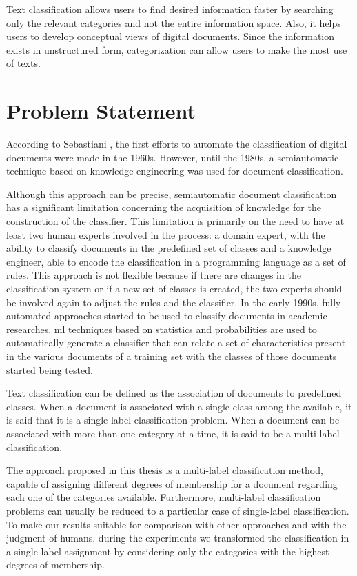 Text classification allows users to find desired information faster by searching only the relevant categories and not the entire information space. Also, it helps users to develop conceptual views of digital documents. Since the information exists in unstructured form, categorization can allow users to make the most use of texts. 




\section{\hspace*{3pt}Problem Statement}


According to Sebastiani \cite{Sebastiani:2002}, the first efforts to automate the classification of digital documents were made in the 1960s. However, until the 1980s, a semiautomatic technique based on knowledge engineering was used for document classification.

Although this approach can be precise, semiautomatic document classification has a significant limitation concerning the acquisition of knowledge for the construction of the classifier. This limitation is primarily on the need to have at least two human experts involved in the process: a domain expert, with the ability to classify documents in the predefined set of classes and a knowledge engineer, able to encode the classification in a programming language as a set of rules. This approach is not flexible because if there are changes in the classification system or if a new set of classes is created, the two experts should be involved again to adjust the rules and the classifier.
In the early 1990s, fully automated approaches started to be used to classify documents in academic researches. \gls{ml} techniques based on statistics and probabilities are used to automatically generate a classifier that can relate a set of characteristics present in the various documents of a training set with the classes of those documents started being tested.


Text classification can be defined as the association of documents to predefined classes. When a document is associated with a single class among the available, it is said that it is a single-label classification problem. When a document can be associated with more than one category at a time, it is said to be a multi-label classification. 

The approach proposed in this thesis is a multi-label classification method, capable of assigning different degrees of membership for a document regarding each one of the categories available. Furthermore, multi-label classification problems can usually be reduced to a particular case of single-label classification\cite{Sebastiani:2002}. To make our results suitable for comparison with other approaches and with the judgment of humans, during the experiments we transformed the classification in a single-label assignment by considering only the categories with the highest degrees of membership.


